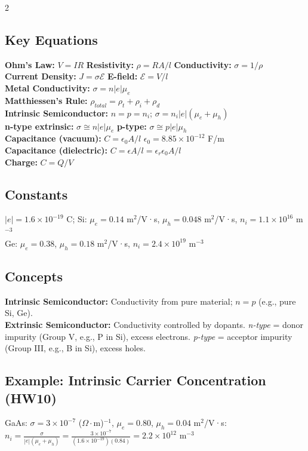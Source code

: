 \documentclass[7pt]{article}
\begin{document}
\begin{multicols*}{2}
\subsection*{Key Equations}
\textbf{Ohm's Law:} $V=IR$ \quad \textbf{Resistivity:} $\rho=RA/l$ \quad \textbf{Conductivity:} $\sigma=1/\rho$ \\
\textbf{Current Density:} $J=\sigma\mathcal{E}$ \quad \textbf{E-field:} $\mathcal{E}=V/l$ \\
\textbf{Metal Conductivity:} $\sigma=n|e|\mu_e$ \\
\textbf{Matthiessen's Rule:} $\rho_{total}=\rho_t+\rho_i+\rho_d$ \\
\textbf{Intrinsic Semiconductor:} $n=p=n_i$; \; $\sigma = n_i|e|(\mu_e+\mu_h)$ \\
\textbf{n-type extrinsic:} $\sigma \cong n|e|\mu_e$ \quad \textbf{p-type:} $\sigma \cong p|e|\mu_h$ \\
\textbf{Capacitance (vacuum):} $C = \epsilon_0 A/l$ \quad $\epsilon_0=8.85\times10^{-12}$ F/m \\
\textbf{Capacitance (dielectric):} $C = \epsilon A/l = \epsilon_r \epsilon_0 A/l$ \\
\textbf{Charge:} $C=Q/V$
\subsection*{Constants}
$|e| = 1.6\times10^{-19}$ C; Si: $\mu_e=0.14$ m$^2$/V·s, $\mu_h=0.048$ m$^2$/V·s, $n_i=1.1\times10^{16}$ m$^{-3}$ \\
Ge: $\mu_e=0.38$, $\mu_h=0.18$ m$^2$/V·s, $n_i=2.4\times10^{19}$ m$^{-3}$
\subsection*{Concepts}
\textbf{Intrinsic Semiconductor:} Conductivity from pure material; $n=p$ (e.g., pure Si, Ge). \\
\textbf{Extrinsic Semiconductor:} Conductivity controlled by dopants. \textit{n-type} = donor impurity (Group V, e.g., P in Si), excess electrons. \textit{p-type} = acceptor impurity (Group III, e.g., B in Si), excess holes.
\subsection*{Example: Intrinsic Carrier Concentration (HW10)}
GaAs: $\sigma=3\times10^{-7}$ ($\Omega\cdot$m)$^{-1}$, $\mu_e=0.80$, $\mu_h=0.04$ m$^2$/V·s: \\
$n_i = \frac{\sigma}{|e|(\mu_e+\mu_h)} = \frac{3\times10^{-7}}{(1.6\times10^{-19})(0.84)} = 2.2\times10^{12}$ m$^{-3}$

\end{multicols*}
\end{document}
